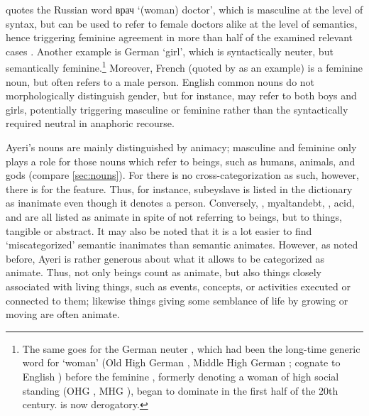 \citet{corbett2006} quotes the Russian word {\FS врач}
 `(woman) doctor', which is masculine at the level of syntax, but can
be used to refer to female doctors alike at the level of semantics, hence
triggering feminine agreement in more than half of the examined relevant cases
\citep[158]{corbett2006}. Another example is German  `girl',
which is syntactically neuter, but semantically feminine.\footnote{The same
goes for the German neuter  \parencite[compare][165--166]
{fleischer2012}, which had been the long-time generic word for `woman' (Old
High German , Middle High German ; cognate to English
) before the feminine , formerly denoting a woman of high
social standing (OHG , MHG ), began to dominate in the
first half of the 20th century.  is now derogatory.} Moreover, French
 (quoted by \cite{wechsler2009} as an example) is a feminine
noun, but often refers to a male person. English common nouns do not
morphologically distinguish gender, but for instance,  may refer to
both boys and girls, potentially triggering masculine  or feminine
 rather than the syntactically required neutral  in anaphoric
recourse.

Ayeri's nouns are mainly distinguished by animacy; masculine and feminine only
plays a role for those nouns which refer to beings, such as humans, animals,
and gods (compare \autoref{sec:nouns}). For \Gend{} there is no
cross-categorization as such, however, there is for the \Anim{} feature. Thus,
for instance,  {subey}{slave} is listed in the dictionary as
inanimate even though it denotes a person. Conversely,
,  {myaltan}{debt},
,  {acid}, and
 are all listed as animate in spite of not referring to
beings, but to things, tangible or abstract. It may also be noted that it is a
lot easier to find `miscategorized' semantic inanimates than semantic animates.
However, as noted before, Ayeri is rather generous about what it allows to be
categorized as animate. Thus, not only beings count as animate, but also things
closely associated with living things, such as events, concepts, or activities
executed or connected to them; likewise things giving some semblance of life
by growing or moving are often animate.

